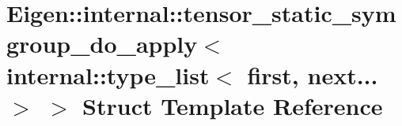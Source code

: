 \hypertarget{struct_eigen_1_1internal_1_1tensor__static__symgroup__do__apply_3_01internal_1_1type__list_3_01first_00_01next_8_8_8_01_4_01_4}{}\section{Eigen\+:\+:internal\+:\+:tensor\+\_\+static\+\_\+symgroup\+\_\+do\+\_\+apply$<$ internal\+:\+:type\+\_\+list$<$ first, next... $>$ $>$ Struct Template Reference}
\label{struct_eigen_1_1internal_1_1tensor__static__symgroup__do__apply_3_01internal_1_1type__list_3_01first_00_01next_8_8_8_01_4_01_4}
